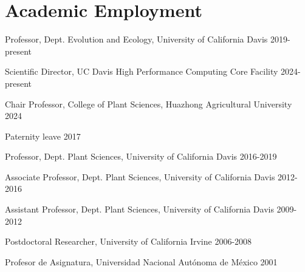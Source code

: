 \documentclass[letterpaper,10pt]{article}
\renewenvironment{itemize}{
  \begin{list}{}{
    \setlength{\leftmargin}{1.5em}
  }
}{
  \end{list}
}
\begin{document}
\section*{Academic Employment}
\begin{itemize}
\setlength\itemsep{0ex}
\item Professor, Dept. Evolution and Ecology, University of California Davis \hfill 2019-present
\item Scientific Director, UC Davis High Performance Computing Core Facility \hfill2024-present
\item Chair Professor, College of Plant Sciences, Huazhong Agricultural University \hfill2024
\item Paternity leave \hfill2017
\item Professor, Dept. Plant Sciences, University of California Davis \hfill2016-2019
\item Associate Professor, Dept. Plant Sciences, University of California Davis \hfill2012-2016
\item Assistant Professor, Dept. Plant Sciences, University of California Davis \hfill2009-2012
\item Postdoctoral Researcher, University of California Irvine \hfill2006-2008
\item Profesor de Asignatura, Universidad Nacional Aut\'{o}noma de M\'{e}xico \hfill2001
\end{itemize}

\end{document}
